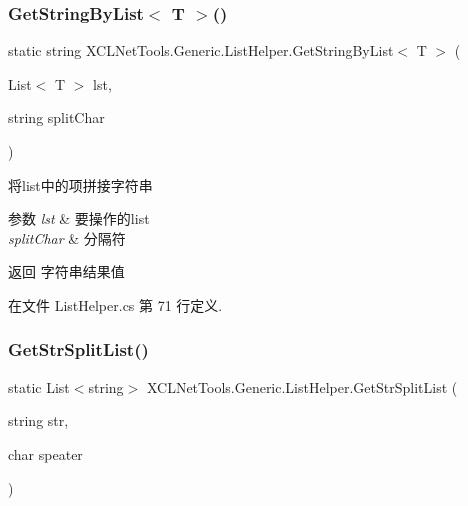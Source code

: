 \subsubsection{\texorpdfstring{Get\+String\+By\+List$<$ T $>$()}{GetStringByList< T >()}}
{\footnotesize\ttfamily static string X\+C\+L\+Net\+Tools.\+Generic.\+List\+Helper.\+Get\+String\+By\+List$<$ T $>$ (\begin{DoxyParamCaption}\item[{List$<$ T $>$}]{lst,  }\item[{string}]{split\+Char }\end{DoxyParamCaption})\hspace{0.3cm}{\ttfamily [static]}}



将list中的项拼接字符串 


\begin{DoxyParams}{参数}
{\em lst} & 要操作的list\\
\hline
{\em split\+Char} & 分隔符\\
\hline
\end{DoxyParams}
\begin{DoxyReturn}{返回}
字符串结果值
\end{DoxyReturn}


在文件 List\+Helper.\+cs 第 71 行定义.

\mbox{\label{class_x_c_l_net_tools_1_1_generic_1_1_list_helper_a3225ddcbde7d47ccef1ab295ebbd2f1d}} 
\subsubsection{\texorpdfstring{Get\+Str\+Split\+List()}{GetStrSplitList()}}
{\footnotesize\ttfamily static List$<$string$>$ X\+C\+L\+Net\+Tools.\+Generic.\+List\+Helper.\+Get\+Str\+Split\+List (\begin{DoxyParamCaption}\item[{string}]{str,  }\item[{char}]{speater }\end{DoxyParamCaption})\hspace{0.3cm}{\ttfamily [static]}}



